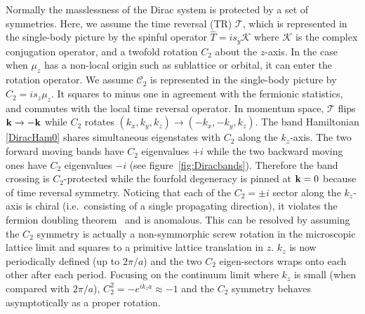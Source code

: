 Normally the masslessness of the Dirac system is protected by a set of symmetries. Here, we assume the time reversal (TR) $\mathcal{T}$, which is represented in the single-body picture by the spinful operator $\hat{T}=is_y\mathcal{K}$ where $\mathcal{K}$ is the complex conjugation operator, and a twofold rotation $C_2$ about the $z$-axis. In the case when $\mu_z$ has a non-local origin such as sublattice or orbital, it can enter the rotation operator. We assume $\mathcal{C}_2$ is represented in the single-body picture by $\hat{C}_2=is_z\mu_z$. It squares to minus one in agreement with the fermionic statistics, and commutes with the local time reversal operator. In momentum space, $\mathcal{T}$ flips ${\bf k}\to-{\bf k}$ while $C_2$ rotates $(k_x,k_y,k_z)\to(-k_x,-k_y,k_z)$. The band Hamiltonian \eqref{DiracHam0} shares simultaneous eigenstates with $C_2$ along the $k_z$-axis. The two forward moving bands have $C_2$ eigenvalues $+i$ while the two backward moving ones have $C_2$ eigenvalues $-i$ (see figure~\ref{fig:Diracbands}). Therefore the band crossing is $C_2$-protected while the fourfold degeneracy is pinned at ${\bf k}=0$ because of time reversal symmetry. Noticing that each of the $C_2=\pm i$ sector along the $k_z$-axis is chiral (i.e.~consisting of a single propagating direction), it violates the fermion doubling theorem~\cite{Nielsen_Ninomiya_1981,NielsenNinomiyaPLB1981} and is anomalous. This can be resolved by assuming the $C_2$ symmetry is actually a non-symmorphic screw rotation in the microscopic lattice limit and squares to a primitive lattice translation in $z$. $k_z$ is now periodically defined (up to $2\pi/a$) and the two $C_2$ eigen-sectors wraps onto each other after each period. Focusing on the continuum limit where $k_z$ is small (when compared with $2\pi/a$), $C_2^2=-e^{ik_za}\approx-1$ and the $C_2$ symmetry behaves asymptotically as a proper rotation.

